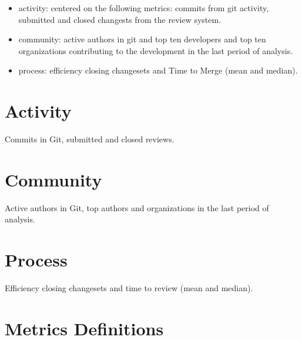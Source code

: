 \documentclass[a4wide,11pt]{report}
\begin{document}
\begin{itemize}
\item activity: centered on the following metrics: commits from git activity, submitted and closed changests from the review system. 
\item community: active authors in git and top ten developers and top ten organizations contributing to the development in the last period of analysis.
\item process: efficiency closing changesets and Time to Merge (mean and median).
\end{itemize}

\chapter{Activity}
Commits in Git, submitted and closed reviews.




\chapter{Community}
Active authors in Git, top authors and organizations in the last period of analysis.




\chapter{Process}
Efficiency closing changesets and time to review (mean and median).
	


\appendix{}

\chapter{Metrics Definitions}
\label{chap:metrics_definitions}
\end{document}

